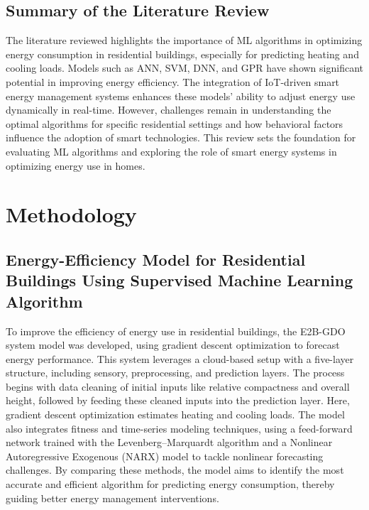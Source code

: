 \documentclass[a4paper, 12pt]{article}
\begin{document}
\subsection{Summary of the Literature Review}
\quad The literature reviewed highlights the importance of ML algorithms in optimizing energy consumption in residential buildings, especially for predicting heating and cooling loads. Models such as ANN, SVM, DNN, and GPR have shown significant potential in improving energy efficiency. The integration of IoT-driven smart energy management systems enhances these models' ability to adjust energy use dynamically in real-time. However, challenges remain in understanding the optimal algorithms for specific residential settings and how behavioral factors influence the adoption of smart technologies. This review sets the foundation for evaluating ML algorithms and exploring the role of smart energy systems in optimizing energy use in homes.
\vspace{7pt}

\section{Methodology}
\subsection{Energy-Efficiency Model for Residential Buildings Using Supervised Machine Learning Algorithm}
\quad To improve the efficiency of energy use in residential buildings, the E2B-GDO system model was developed, using gradient descent optimization to forecast energy performance. This system leverages a cloud-based setup with a five-layer structure, including sensory, preprocessing, and prediction layers. The process begins with data cleaning of initial inputs like relative compactness and overall height, followed by feeding these cleaned inputs into the prediction layer. Here, gradient descent optimization estimates heating and cooling loads. The model also integrates fitness and time-series modeling techniques, using a feed-forward network trained with the Levenberg–Marquardt algorithm and a Nonlinear Autoregressive Exogenous (NARX) model to tackle nonlinear forecasting challenges. By comparing these methods, the model aims to identify the most accurate and efficient algorithm for predicting energy consumption, thereby guiding better energy management interventions.
\vspace{7pt}
\end{document}
